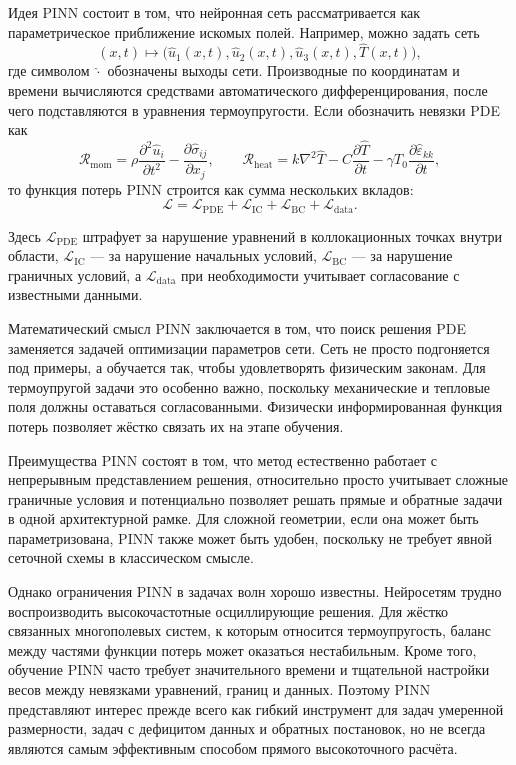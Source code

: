 Идея PINN состоит в том, что нейронная сеть рассматривается как параметрическое приближение искомых полей. Например, можно задать сеть
\begin{equation}
(x,t)\mapsto \big(\hat u_1(x,t),\hat u_2(x,t),\hat u_3(x,t),\hat T(x,t)\big),
\end{equation}
где символом $\hat{\cdot}$ обозначены выходы сети. Производные по координатам и времени вычисляются средствами автоматического дифференцирования, после чего подставляются в уравнения термоупругости. Если обозначить невязки PDE как
\begin{equation}
\mathcal{R}_{\mathrm{mom}}=
\rho \frac{\partial^2 \hat u_i}{\partial t^2}
-\frac{\partial \hat\sigma_{ij}}{\partial x_j},
\qquad
\mathcal{R}_{\mathrm{heat}}=
k\nabla^2\hat T
-C\frac{\partial \hat T}{\partial t}
-\gamma T_0\frac{\partial \hat\varepsilon_{kk}}{\partial t},
\end{equation}
то функция потерь PINN строится как сумма нескольких вкладов:
\begin{equation}
\mathcal{L}
=
\mathcal{L}_{\mathrm{PDE}}
+
\mathcal{L}_{\mathrm{IC}}
+
\mathcal{L}_{\mathrm{BC}}
+
\mathcal{L}_{\mathrm{data}}.
\end{equation}

Здесь $\mathcal{L}_{\mathrm{PDE}}$ штрафует за нарушение уравнений в коллокационных точках внутри области, $\mathcal{L}_{\mathrm{IC}}$ --- за нарушение начальных условий, $\mathcal{L}_{\mathrm{BC}}$ --- за нарушение граничных условий, а $\mathcal{L}_{\mathrm{data}}$ при необходимости учитывает согласование с известными данными.

Математический смысл PINN заключается в том, что поиск решения PDE заменяется задачей оптимизации параметров сети. Сеть не просто подгоняется под примеры, а обучается так, чтобы удовлетворять физическим законам. Для термоупругой задачи это особенно важно, поскольку механические и тепловые поля должны оставаться согласованными. Физически информированная функция потерь позволяет жёстко связать их на этапе обучения.

Преимущества PINN состоят в том, что метод естественно работает с непрерывным представлением решения, относительно просто учитывает сложные граничные условия и потенциально позволяет решать прямые и обратные задачи в одной архитектурной рамке. Для сложной геометрии, если она может быть параметризована, PINN также может быть удобен, поскольку не требует явной сеточной схемы в классическом смысле.

Однако ограничения PINN в задачах волн хорошо известны. Нейросетям трудно воспроизводить высокочастотные осциллирующие решения. Для жёстко связанных многополевых систем, к которым относится термоупругость, баланс между частями функции потерь может оказаться нестабильным. Кроме того, обучение PINN часто требует значительного времени и тщательной настройки весов между невязками уравнений, границ и данных. Поэтому PINN представляют интерес прежде всего как гибкий инструмент для задач умеренной размерности, задач с дефицитом данных и обратных постановок, но не всегда являются самым эффективным способом прямого высокоточного расчёта.

